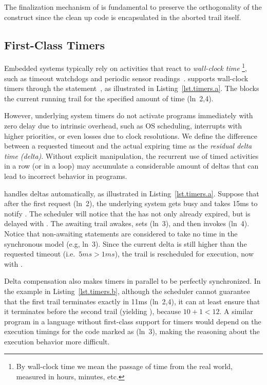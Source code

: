 The finalization mechanism of \CEU is fundamental to preserve the orthogonality
of the  construct since the clean up code is encapsulated in the
aborted trail itself.

\subsection{First-Class Timers}
\label{sec.ceu.timers}

Embedded systems typically rely on activities that react to
\emph{wall-clock time}%
\footnote{
By wall-clock time we mean the passage of time from the real world, measured in 
hours, minutes, etc.
}, such as timeout watchdogs and periodic sensor readings~\cite{esterel.delays}.
%
\CEU supports wall-clock timers through the 
statement~\cite{ceu.tecs17}, as illustrated in Listing~\ref{lst.timers.a}.
The  blocks the current running trail for the specified amount of
time (ln~2,4).

However, underlying system timers do not activate programs immediately with
zero delay due to intrinsic overhead, such as OS scheduling, interrupts with
higher priorities, or even losses due to clock resolutions.
%
We define the difference between a requested timeout and the actual expiring 
time as the \emph{residual delta time (delta)}.
Without explicit manipulation, the recurrent use of timed activities in a row 
(or in a loop) may accumulate a considerable amount of deltas that can lead to 
incorrect behavior in programs.

\CEU handles deltas automatically, as illustrated in Listing~\ref{lst.timers.a}.
Suppose that after the first  request (ln~2), the underlying
system gets busy and takes 15ms to notify \CEU.
%
The scheduler will notice that the  has not only already expired,
but is delayed with .
The awaiting trail awakes, sets  (ln~3), and then invokes
 (ln~4).
%
Notice that non-awaiting statements are considered to take no time in the
synchronous model (e.g, ln~3).
%
Since the current delta is still higher than the requested timeout
(i.e.~$5ms>1ms$), the trail is rescheduled for execution, now with
.

Delta compensation also makes timers in parallel to be perfectly synchronized.
%
In the example in Listing~\ref{lst.timers.b}, although the scheduler cannot
guarantee that the first trail terminates exactly in 11ms (ln~2,4), it can at
least ensure that it terminates before the second trail (yielding ),
because $10+1<12$.
%
A similar program in a language without first-class support for timers would 
depend on the execution timings for the code marked as  (ln~3),
making the reasoning about the execution behavior more difficult.

